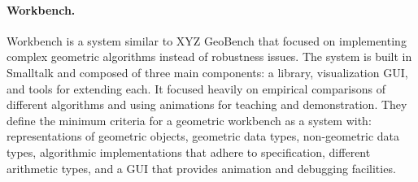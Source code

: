 \paragraph{Workbench.}

Workbench is a system similar to XYZ GeoBench that focused on implementing
complex geometric algorithms instead of robustness issues. The system is built
in Smalltalk and composed of three main components: a library, visualization
GUI, and tools for extending each. It focused heavily on empirical comparisons
of different algorithms and using animations for teaching and demonstration.
They define the minimum criteria for a geometric workbench as a system with:
representations of geometric objects, geometric data types, non-geometric data
types, algorithmic implementations that adhere to specification, different
arithmetic types, and a GUI that provides animation and debugging facilities.

% 

